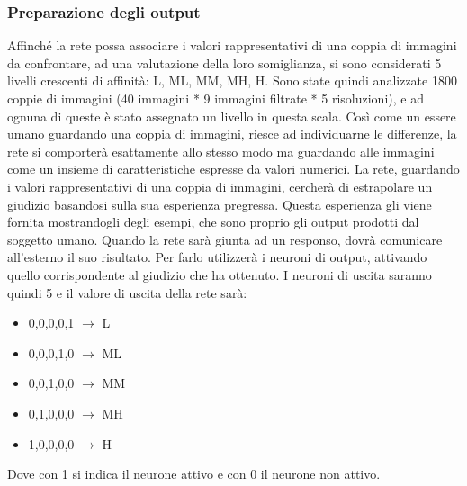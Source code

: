 \documentclass[a4paper,11pt]{article}
\begin{document}
    \subsubsection{Preparazione degli output}
    Affinché la rete possa associare i valori rappresentativi di una coppia di immagini da confrontare, 
    ad una valutazione della loro somiglianza, si sono considerati 5 livelli crescenti di affinità: L, ML, MM, MH, H. 
    Sono state quindi analizzate 1800 coppie di immagini (40 immagini * 9 immagini filtrate * 5 risoluzioni), e ad ognuna di queste
    è stato assegnato un livello in questa scala.
    Così come un essere umano guardando una coppia di immagini, riesce ad individuarne le differenze, la rete si comporterà esattamente allo stesso modo ma 
    guardando alle immagini come un insieme di caratteristiche espresse da valori numerici.
    La rete, guardando i valori rappresentativi di una coppia di immagini, cercherà di estrapolare un giudizio basandosi sulla sua esperienza pregressa.
    Questa esperienza gli viene fornita mostrandogli degli esempi, che sono proprio gli output prodotti dal soggetto umano. 
    Quando la rete sarà giunta ad un responso, dovrà comunicare all'esterno il suo risultato. Per farlo utilizzerà i neuroni di output, attivando quello corrispondente al giudizio che ha ottenuto.
    I neuroni di uscita saranno quindi 5 e il valore di uscita della rete sarà:
    \begin{itemize}
        \item {0,0,0,0,1} $\rightarrow$ L 
        \item {0,0,0,1,0} $\rightarrow$ ML
        \item {0,0,1,0,0} $\rightarrow$ MM
        \item {0,1,0,0,0} $\rightarrow$ MH
        \item {1,0,0,0,0} $\rightarrow$ H
    \end{itemize}
    Dove con 1 si indica il neurone attivo e con 0 il neurone non attivo.
    \newpage
\end{document}
